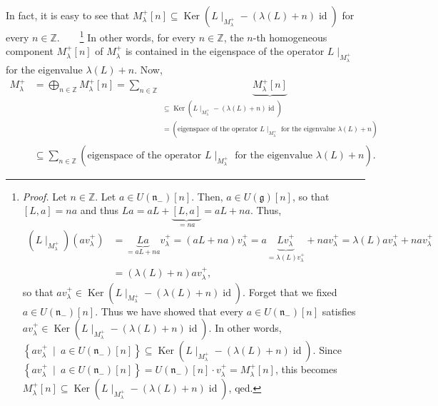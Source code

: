\documentclass[etingof-lie.tex]{subfiles}
\begin{document}
In fact, it is easy to see that $M_{\lambda}^{+}\left[  n\right]
\subseteq\operatorname*{Ker}\left(  L\mid_{M_{\lambda}^{+}}-\left(
\lambda\left(  L\right)  +n\right)  \operatorname*{id}\right)  $ for every
$n\in\mathbb{Z}$.\ \ \ \ \footnote{\textit{Proof.} Let $n\in\mathbb{Z}$. Let
$a\in U\left(  \mathfrak{n}_{-}\right)  \left[  n\right]  $. Then, $a\in
U\left(  \mathfrak{g}\right)  \left[  n\right]  $, so that $\left[
L,a\right]  =na$ and thus $La=aL+\underbrace{\left[  L,a\right]  }%
_{=na}=aL+na$. Thus,%
\begin{align*}
\left(  L\mid_{M_{\lambda}^{+}}\right)  \left(  av_{\lambda}^{+}\right)   &
=\underbrace{La}_{=aL+na}v_{\lambda}^{+}=\left(  aL+na\right)  v_{\lambda}%
^{+}=a\underbrace{Lv_{\lambda}^{+}}_{=\lambda\left(  L\right)  v_{\lambda}%
^{+}}+nav_{\lambda}^{+}=\lambda\left(  L\right)  av_{\lambda}^{+}%
+nav_{\lambda}^{+}\\
&  =\left(  \lambda\left(  L\right)  +n\right)  av_{\lambda}^{+},
\end{align*}
so that $av_{\lambda}^{+}\in\operatorname*{Ker}\left(  L\mid_{M_{\lambda}^{+}%
}-\left(  \lambda\left(  L\right)  +n\right)  \operatorname*{id}\right)  $.
Forget that we fixed $a\in U\left(  \mathfrak{n}_{-}\right)  \left[  n\right]
$. Thus we have showed that every $a\in U\left(  \mathfrak{n}_{-}\right)
\left[  n\right]  $ satisfies $av_{\lambda}^{+}\in\operatorname*{Ker}\left(
L\mid_{M_{\lambda}^{+}}-\left(  \lambda\left(  L\right)  +n\right)
\operatorname*{id}\right)  $. In other words, $\left\{  av_{\lambda}^{+}%
\ \mid\ a\in U\left(  \mathfrak{n}_{-}\right)  \left[  n\right]  \right\}
\subseteq\operatorname*{Ker}\left(  L\mid_{M_{\lambda}^{+}}-\left(
\lambda\left(  L\right)  +n\right)  \operatorname*{id}\right)  $. Since
$\left\{  av_{\lambda}^{+}\ \mid\ a\in U\left(  \mathfrak{n}_{-}\right)
\left[  n\right]  \right\}  =U\left(  \mathfrak{n}_{-}\right)  \left[
n\right]  \cdot v_{\lambda}^{+}=M_{\lambda}^{+}\left[  n\right]  $, this
becomes $M_{\lambda}^{+}\left[  n\right]  \subseteq\operatorname*{Ker}\left(
L\mid_{M_{\lambda}^{+}}-\left(  \lambda\left(  L\right)  +n\right)
\operatorname*{id}\right)  $, qed.} In other words, for every $n\in\mathbb{Z}%
$, the $n$-th homogeneous component $M_{\lambda}^{+}\left[  n\right]  $ of
$M_{\lambda}^{+}$ is contained in the eigenspace of the operator
$L\mid_{M_{\lambda}^{+}}$ for the eigenvalue $\lambda\left(  L\right)  +n$.
Now,%
\begin{align*}
M_{\lambda}^{+}  &  =\bigoplus\limits_{n\in\mathbb{Z}}M_{\lambda}^{+}\left[
n\right]  =\sum\limits_{n\in\mathbb{Z}}\underbrace{M_{\lambda}^{+}\left[
n\right]  }_{\substack{\subseteq\operatorname*{Ker}\left(  L\mid_{M_{\lambda
}^{+}}-\left(  \lambda\left(  L\right)  +n\right)  \operatorname*{id}\right)
\\=\left(  \text{eigenspace of the operator }L\mid_{M_{\lambda}^{+}}\text{ for
the eigenvalue }\lambda\left(  L\right)  +n\right)  }}\\
&  \subseteq\sum\limits_{n\in\mathbb{Z}}\left(  \text{eigenspace of the
operator }L\mid_{M_{\lambda}^{+}}\text{ for the eigenvalue }\lambda\left(
L\right)  +n\right)  .
\end{align*}
\end{document}
